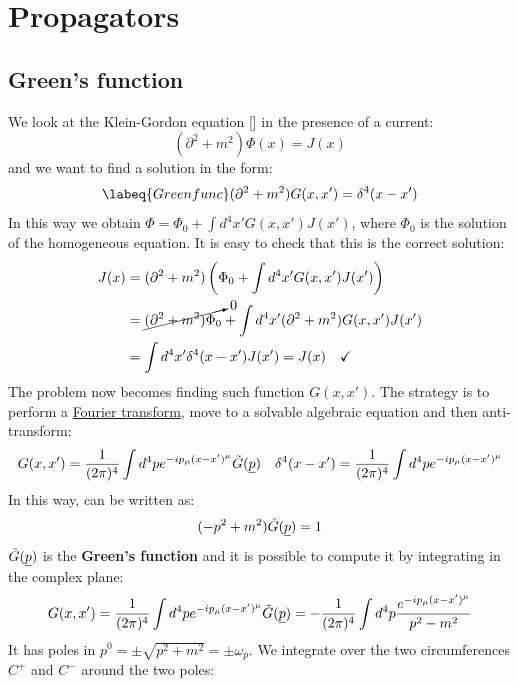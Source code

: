 \documentclass[../main.tex]{subfiles}
\begin{document}
\setchapterpreamble[u]{\margintoc}
\chapter[Propagators]{Propagators\footnotemark[0]}
\section{Green's function}
We look at the Klein-Gordon equation [] in the presence of a current:
\[
(\partial^2+m^2)\Phi(x)=J(x)
\]
and we want to find a solution in the form:
\begin{equation}
\labeq{Greenfunc}
(\partial^2+m^2)G(x,x')=\delta^4(x-x')
\end{equation}
In this way we obtain $\Phi=\Phi_0+\int d^4x'G(x,x')J(x')$, where $\Phi_0$ is the solution of the homogeneous equation. It is easy to check that this is the correct solution:
\begin{align*}
J(x)&=(\partial^2+m^2)\left(\Phi_0+\int d^4x'G(x,x')J(x')\right)\\
&=\cancelto{0}{(\partial^2+m^2)\Phi_0}+\int d^4x'(\partial^2+m^2)G(x,x')J(x')\\
&=\int d^4x'\delta^4(x-x')J(x')=J(x) \quad \checkmark
\end{align*}
The problem now becomes finding such function $G(x,x')$. The strategy is to perform a \href{https://en.wikipedia.org/wiki/Fourier_transform}{Fourier transform}, move to a solvable algebraic equation and then anti-transform:
\[
G(x,x')=\frac{1}{(2\pi)^4}\int d^4pe^{-ip_\mu(x-x')^\mu}\Tilde{G}(\underline{p}) \quad \delta^4(x-x')=\frac{1}{(2\pi)^4}\int d^4pe^{-ip_\mu(x-x')^\mu}
\]
In this way,  can be written as:
\[
(-p^2+m^2)\Tilde{G}(\underline{p})=1
\]
$\Tilde{G}(\underline{p})$ is the \textbf{Green's function} and it is possible to compute it by integrating in the complex plane:
\[
G(x,x')=\frac{1}{(2\pi)^4}\int d^4pe^{-ip_\mu(x-x')^\mu}\Tilde{G}(\underline{p})=-\frac{1}{(2\pi)^4}\int d^4p\frac{e^{-ip_\mu(x-x')^\mu}}{p^2-m^2}
\]
It has poles in $p^0=\pm\sqrt{p^2+m^2}=\pm\omega_p$.
We integrate over the two circumferences $C^+$ and $C^-$ around the two poles:
\end{document}
